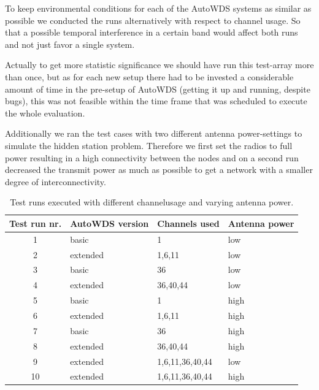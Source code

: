     To keep environmental conditions for each of the AutoWDS systems as similar as possible we conducted the runs alternatively with respect to channel usage.
    So that a possible temporal interference in a certain band would affect both runs and not just favor a single system.
  
    Actually to get more statistic significance we should have run this test-array more than once, but as for each new setup there had to 
    be invested a considerable amount of time in the pre-setup of AutoWDS (getting it up and running, despite bugs), 
    this was not feasible within the time frame that was scheduled to execute the whole evaluation.
    
    Additionally we ran the test cases with two different antenna power-settings to simulate the hidden station problem. 
    Therefore we first set the radios to full power resulting in a high connectivity between the nodes and on a second 
    run decreased the transmit power as much as possible to get a network with a smaller degree of interconnectivity.
  
    \begin{table}[h!]
      \centering
      \begin{tabular}{clll}
	Test run nr. & AutoWDS version & Channels used & Antenna power\\ \hline
	1 & basic & 1 & low \\
	2 & extended & 1,6,11 & low \\
	3 & basic & 36 & low \\
	4 & extended & 36,40,44 & low \\
	5 & basic & 1 & high \\
	6 & extended & 1,6,11 & high \\
	7 & basic & 36 & high \\
	8 & extended & 36,40,44 & high \\
	9 & extended & 1,6,11,36,40,44 & low \\
	10 & extended & 1,6,11,36,40,44 & high \\
      \end{tabular}
      \caption{Test runs executed with different channelusage and varying antenna power.}
      \label{tab:testruns}
    \end{table}
    
\newpage
    
